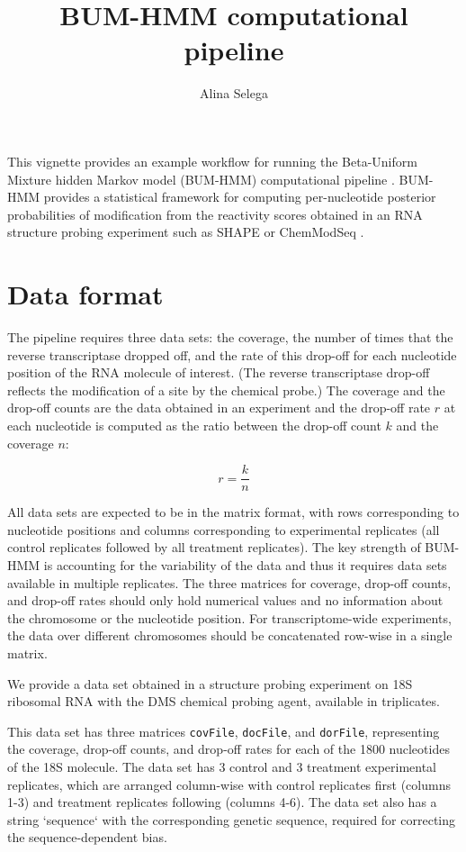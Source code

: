 \documentclass{article}\usepackage[]{graphicx}\usepackage[]{color}
\begin{document}
\title{BUM-HMM computational pipeline}

\author{Alina Selega}

\maketitle

This vignette provides an example workflow for running the Beta-Uniform Mixture
hidden Markov model (BUM-HMM) computational pipeline \cite{selega2016robust}.
BUM-HMM provides a statistical framework for computing per-nucleotide posterior
probabilities of modification from the reactivity scores obtained in an RNA
structure probing experiment such as SHAPE \cite{spitale2013rna} or ChemModSeq
\cite{hector2014snapshots}.

\section{Data format}

The pipeline requires three data sets: the coverage, the number of times that
the reverse transcriptase dropped off, and the rate of this drop-off for each
nucleotide position of the RNA molecule of interest. (The reverse transcriptase
drop-off reflects the modification of a site by the chemical probe.) The
coverage and the drop-off counts are the data obtained in an experiment and the
drop-off rate $r$ at each nucleotide is computed as the ratio between the
drop-off count $k$ and the coverage $n$:

\[r = \frac{k}{n}\]

All data sets are expected to be in the matrix format, with rows corresponding
to nucleotide positions and columns corresponding to experimental replicates
(all control replicates followed by all treatment replicates). The key strength
of BUM-HMM is accounting for the variability of the data and thus it requires
data sets available in multiple replicates. The three matrices for coverage,
drop-off counts, and drop-off rates should only hold numerical values and no
information about the chromosome or the nucleotide position. For
transcriptome-wide experiments, the data over different chromosomes should be
concatenated row-wise in a single matrix.

We provide a data set obtained in a structure probing experiment on 18S
ribosomal RNA with the DMS chemical probing agent, available in triplicates.

This data set has three matrices \texttt{covFile}, \texttt{docFile}, and
\texttt{dorFile}, representing the coverage, drop-off counts, and drop-off rates
for each of the 1800 nucleotides of the 18S molecule. The data set has 3 control
and 3 treatment experimental replicates, which are arranged column-wise with
control replicates first (columns 1-3) and treatment replicates following
(columns 4-6). The data set also has a string `sequence` with the corresponding
genetic sequence, required for correcting the sequence-dependent bias.
\end{document}

